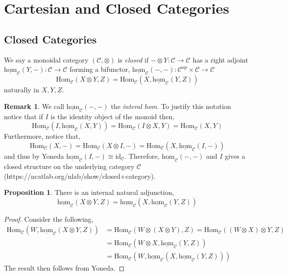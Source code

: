 \documentclass[12pt]{extarticle}
\newcommand{\Hom}[3]{\mathrm{Hom}_{#1}\left( #2, #3 \right)}
\newcommand{\id}{\mathrm{id}}
\theoremstyle{definition}
\newtheorem{proposition}[theorem]{Proposition}
\newtheorem{remark}{Remark}
\newenvironment{definition}[1][Definition:]{\begin{trivlist}
\item[\hskip \labelsep {\bfseries #1}]}{\end{trivlist}}
\newcommand{\C}{\mathbb{C}}
\begin{document}
\renewcommand{\C}{\mathcal{C}}
\newcommand{\D}{\mathcal{D}}
\newcommand{\inthom}[3]{\underline{\mathrm{hom}}_{#1} \! \left( #2, #3 \right)}

\section{Cartesian and Closed Categories}

\subsection{Closed Categories}

\newcommand{\op}{\mathrm{op}}

\begin{definition}
We say a monoidal category $(\C, \otimes)$ is \textit{closed} if $- \otimes Y : \C \to \C$ has a right adjoint $\inthom{\C}{Y}{-} : \C \to \C$ forming a bifunctor, $\inthom{\C}{-}{-} : \C^\op \times \C \to \C$
\[ \Hom{\C}{X \otimes Y}{Z} = \Hom{\C}{X}{\inthom{\C}{Y}{Z}} \]
naturally in $X, Y, Z$.
\end{definition}

\begin{remark}
We call $\inthom{\C}{-}{-}$ the \textit{interal hom}. To justify this notation notice that if $I$ is the identity object of the monoid then,
\[ \Hom{\C}{I}{\inthom{\C}{X}{Y}}  = \Hom{\C}{I \otimes X}{Y} = \Hom{\C}{X}{Y}  \]
Furthermore, notice that,
\[ \Hom{\C}{X}{-} = \Hom{\C}{X \otimes I}{-} = \Hom{\C}{X}{\inthom{\C}{I}{-}} \]
and thus by Yoneda $\inthom{\C}{I}{-} \cong \id_{\C}$.
Therefore, $\inthom{\C}{-}{-}$ and $I$ gives a closed structure on the underlying category $\C$ (https://ncatlab.org/nlab/show/closed+category).
\end{remark}

\begin{proposition}
There is an internal natural adjunction,
\[ \inthom{\C}{X \otimes Y}{Z} = \inthom{\C}{X}{\inthom{\C}{Y}{Z}} \]
\end{proposition}

\begin{proof}
Consider the following,
\begin{align*}
\Hom{\C}{W}{\inthom{\C}{X \otimes Y}{Z}} & = \Hom{\C}{W \otimes (X \otimes Y)}{Z} = \Hom{\C}{(W \otimes X) \otimes Y}{Z}
\\
& = \Hom{\C}{W \otimes X}{\inthom{\C}{Y}{Z}} 
\\
& = \Hom{\C}{W}{\inthom{\C}{X}{\inthom{\C}{Y}{Z}}} 
\end{align*}
The result then follows from Yoneda.
\end{proof}
\end{document}

